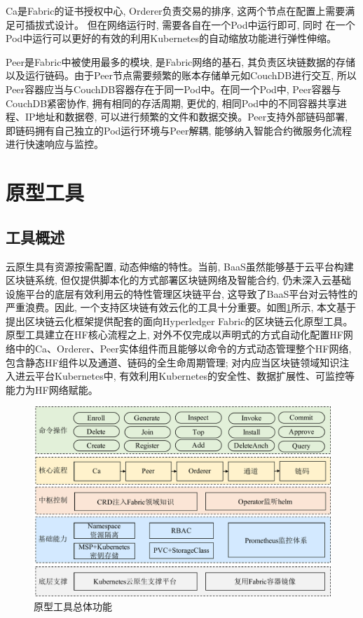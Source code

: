 Ca是Fabric的证书授权中心, Orderer负责交易的排序, 这两个节点在配置上需要满足可插拔式设计。 但在网络运行时, 需要各自在一个Pod中运行即可, 同时 在一个Pod中运行可以更好的有效的利用Kubernetes的自动缩放功能进行弹性伸缩。

Peer是Fabric中被使用最多的模块, 是Fabric网络的基石, 其负责区块链数据的存储以及运行链码。由于Peer节点需要频繁的账本存储单元如CouchDB进行交互, 所以Peer容器应当与CouchDB容器存在于同一Pod中。在同一个Pod中, Peer容器与CouchDB紧密协作, 拥有相同的存活周期, 更优的, 相同Pod中的不同容器共享进程、IP地址和数据卷, 可以进行频繁的文件和数据交换。Peer支持外部链码部署, 即链码拥有自己独立的Pod运行环境与Peer解耦, 能够纳入智能合约微服务化流程\cite{zhangfuli2021smartcontract}进行快速响应与监控。 

\section{原型工具}

\subsection{工具概述}

云原生具有资源按需配置, 动态伸缩的特性。当前, BaaS虽然能够基于云平台构建区块链系统, 但仅提供脚本化的方式部署区块链网络及智能合约, 仍未深入云基础设施平台的底层有效利用云的特性管理区块链平台, 这导致了BaaS平台对云特性的严重浪费。因此, 一个支持区块链有效云化的工具十分重要。如图\ref{toolstotal}所示, 本文基于提出区块链云化框架提供配套的面向Hyperledger Fabric的区块链云化原型工具。原型工具建立在HF核心流程之上, 对外不仅完成以声明式的方式自动化配置HF网络中的Ca、Orderer、Peer实体组件而且能够以命令的方式动态管理整个HF网络, 包含静态HF组件以及通道、链码的全生命周期管理; 对内应当区块链领域知识注入进云平台Kubernetes中, 有效利用Kubernetes的安全性、数据扩展性、可监控等能力为HF网络赋能。

\begin{figure}[!htbp] %
    \centering %
    \includegraphics[width=1.0\textwidth]{FIGs/chapter4/tool.pdf} %
    \caption{原型工具总体功能} %
    \label{toolstotal} %
\end{figure}%

